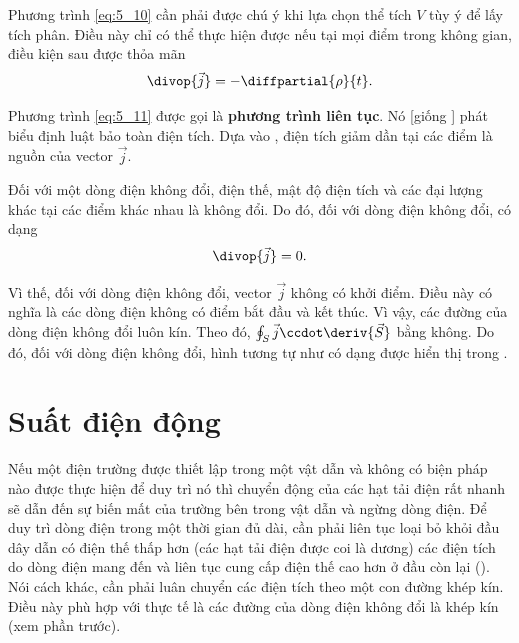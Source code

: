 \noindent
Phương trình \eqref{eq:5_10} cần phải được chú ý khi lựa chọn thể tích $V$ tùy ý để lấy tích phân. Điều này chỉ có thể thực hiện được nếu tại mọi điểm trong không gian, điều kiện sau được thỏa mãn 
\begin{equation}\label{eq:5_11}
    \divop{\vec{j}} = - \diffpartial{\rho}{t}.
\end{equation}

\noindent
Phương trình \eqref{eq:5_11} được gọi là \textbf{phương trình liên tục}. Nó [giống ] phát biểu định luật bảo toàn điện tích. Dựa vào , điện tích giảm dần tại các điểm là nguồn của vector $\vec{j}$.

Đối với một dòng điện không đổi, điện thế, mật độ điện tích và các đại lượng khác tại các điểm khác nhau là không đổi. Do đó, đối với dòng điện không đổi,  có dạng
\begin{equation}\label{eq:5_12}
    \divop{\vec{j}} = 0.
\end{equation}

\noindent
Vì thế, đối với dòng điện không đổi, vector $\vec{j}$ không có khởi điểm. Điều này có nghĩa là các dòng điện không có điểm bắt đầu và kết thúc. Vì vậy, các đường của dòng điện không đổi luôn kín. Theo đó, $\oint_S\vec{j}\ccdot\deriv{\vec{S}}$ bằng không. Do đó, đối với dòng điện không đổi, hình tương tự như  có dạng được hiển thị trong .

\section{Suất điện động}\label{sec:5_3}

Nếu một điện trường được thiết lập trong một vật dẫn và không có biện pháp nào được thực hiện để duy trì nó thì chuyển động của các hạt tải điện rất nhanh sẽ dẫn đến sự biến mất của trường bên trong vật dẫn và ngừng dòng điện. Để duy trì dòng điện trong một thời gian đủ dài, cần phải liên tục loại bỏ khỏi đầu dây dẫn có điện thế thấp hơn (các hạt tải điện được coi là dương) các điện tích do dòng điện mang đến và liên tục cung cấp điện thế cao hơn ở đầu còn lại (). Nói cách khác, cần phải luân chuyển các điện tích theo một con đường khép kín. Điều này phù hợp với thực tế là các đường của dòng điện không đổi là khép kín (xem phần trước).

